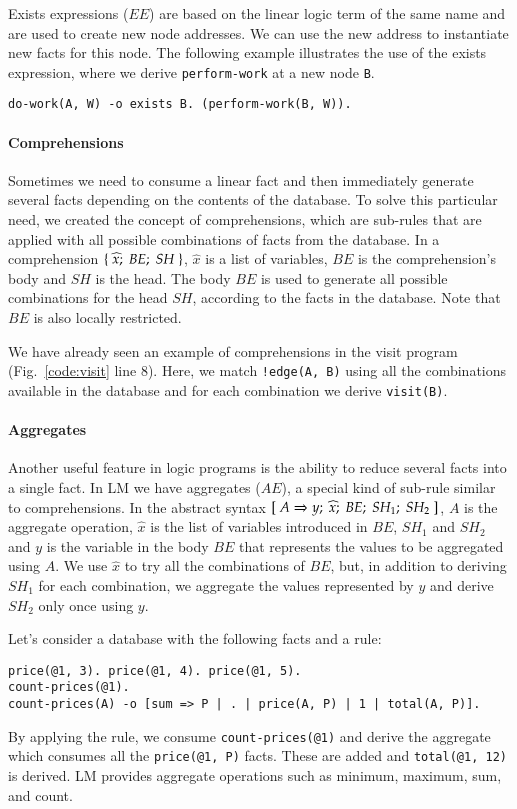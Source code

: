 Exists expressions ($EE$) are based on the linear logic term of the same name and are used to create new node addresses.
We can use the new address to instantiate new facts for this node.  
The following example illustrates the use of the exists expression, where we derive
\texttt{perform-work} at a new node \texttt{B}.

{\small
\begin{Verbatim}
do-work(A, W) -o exists B. (perform-work(B, W)).
\end{Verbatim}
}

\paragraph{Comprehensions}

Sometimes we need to consume a linear fact and then immediately generate several facts depending on
the contents of the database. To solve this particular need, we created the concept of comprehensions, which are
sub-rules that are applied with all possible combinations of facts from the database. In a comprehension $\{ \; \widehat{x}; \; BE; \; SH \; \}$, $\widehat{x}$ is a list of variables, $BE$ is the comprehension's body and $SH$ is the head.
The body $BE$ is used to generate all possible combinations for the head $SH$, according to the facts
in the database. Note that $BE$ is also locally restricted.

We have already seen an example of comprehensions in the visit program (Fig.~\ref{code:visit} line 8).
Here, we match \texttt{!edge(A, B)} using all the combinations available in the database and for each combination we derive \texttt{visit(B)}.

\paragraph{Aggregates}

Another useful feature in logic programs is the ability to reduce several facts into a single fact.
In LM we have aggregates ($AE$), a special kind of sub-rule similar to comprehensions.
In the abstract syntax $[\; A \Rightarrow y; \; \widehat{x}; \; BE; \; SH_1; \; SH_2 \;]$, $A$ is the aggregate operation, $\widehat{x}$ is the list of variables
introduced in $BE$, $SH_1$ and $SH_2$ and $y$ is the variable in the body
$BE$ that represents the values to be aggregated using $A$.
We use $\widehat{x}$ to try all the combinations of $BE$, but, in addition to deriving $SH_1$ for each combination,
we aggregate the values represented by $y$ and derive $SH_2$ only once using $y$.

Let's consider a database with the following facts and a rule:

{\small
\begin{Verbatim}
price(@1, 3). price(@1, 4). price(@1, 5).
count-prices(@1).
count-prices(A) -o [sum => P | . | price(A, P) | 1 | total(A, P)].
\end{Verbatim}
}

By applying the rule, we consume \texttt{count-prices(@1)} and
derive the aggregate which consumes all the \texttt{price(@1, P)} facts.
These are added and \texttt{total(@1,~12)} is derived.
LM provides aggregate operations such as minimum, maximum, sum, and count.
